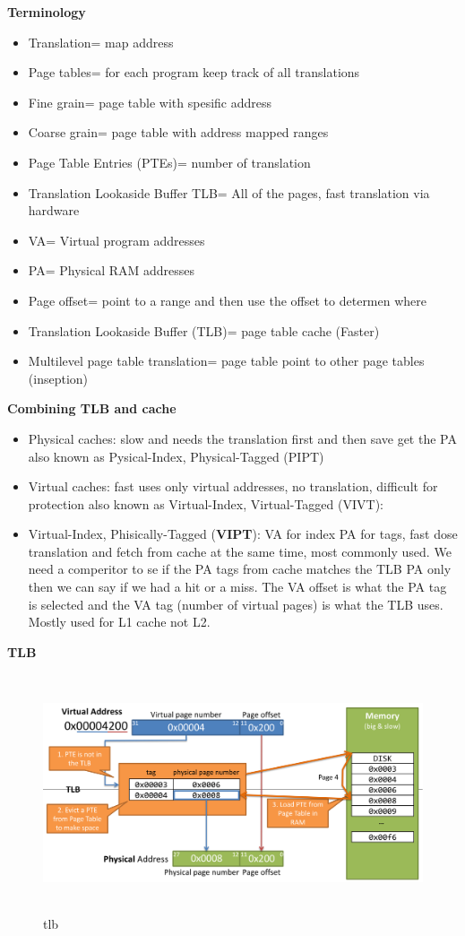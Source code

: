 \textbf{Terminology}
\begin{itemize}
\item  Translation= map address
\item  Page tables= for each program keep track of all translations
\item  Fine grain= page table with spesific address
\item  Coarse grain= page table with address mapped ranges
\item  Page Table Entries (PTEs)= number of translation  
\item  Translation Lookaside Buffer TLB= All of the pages, fast translation via hardware
\item  VA= Virtual program addresses
\item  PA= Physical RAM addresses
\item  Page offset= point to a range and then use the offset to determen where
\item  Translation Lookaside Buffer (TLB)= page table cache (Faster)
\item  Multilevel page table translation= page table point to other page tables (inseption)
\end{itemize}

\newpage

\textbf{Combining TLB and cache}
\begin{itemize}
\item  Physical caches: slow and needs the translation first and then save get the PA
  also known as Pysical-Index, Physical-Tagged (PIPT)
\item  Virtual caches: fast uses only virtual addresses, no translation, difficult for protection
  also known as Virtual-Index, Virtual-Tagged (VIVT):
\item  Virtual-Index, Phisically-Tagged (\textbf{VIPT}): VA for index PA for tags, fast dose translation and
  fetch from cache at the same time, most commonly used.
  We need a comperitor to se if the PA tags from cache matches the TLB PA only then we can say if we had a hit or a miss.
  The VA offset is what the PA tag is selected and the VA tag (number of virtual pages) is what the TLB uses.
  Mostly used for L1 cache not L2.
\end{itemize}

\textbf{TLB}
\begin{figure}[h]
    \vspace{10mm}
    \centering
    \includegraphics[width=16cm, height=7cm]{image/tlb.png}
    \caption{tlb}
\end{figure}

